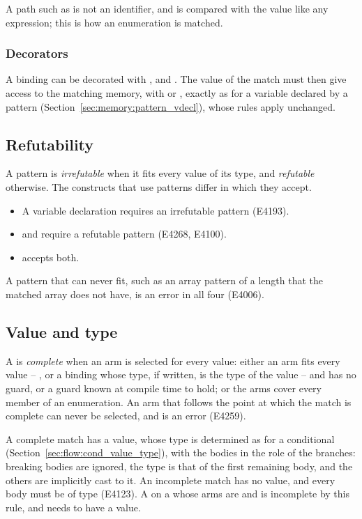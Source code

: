 A path such as  is not an identifier, and is compared with the
value like any expression; this is how an enumeration is matched.

\subsubsection{Decorators}

A binding can be decorated with ,  and . The
value of the match must then give access to the matching memory, with
 or , exactly as for a variable declared by a pattern
(Section~\ref{sec:memory:pattern_vdecl}), whose rules apply unchanged.

\subsection{Refutability}

A pattern is \textit{irrefutable} when it fits every value of its type, and
\textit{refutable} otherwise. The constructs that use patterns differ in which
they accept.

\begin{itemize}
\item A variable declaration requires an irrefutable pattern (E4193).
\item {} and  require a refutable pattern (E4268,
  E4100).
\item {} accepts both.
\end{itemize}

A pattern that can never fit, such as an array pattern of a length that the
matched array does not have, is an error in all four (E4006).

\subsection{Value and type}

A  is \textit{complete} when an arm is selected for every value:
either an arm fits every value -- \token{\_}, or a binding whose type, if
written, is the type of the value -- and has no guard, or a guard known at
compile time to hold; or the arms cover every member of an enumeration.
An arm that follows the point at which the match is complete can never be
selected, and is an error (E4259).

A complete match has a value, whose type is determined as for a conditional
(Section~\ref{sec:flow:cond_value_type}), with the bodies in the role of the
branches: breaking bodies are ignored, the type is that of the first remaining
body, and the others are implicitly cast to it. An incomplete match has no value,
and every body must be of type  (E4123). A  on a
 whose arms are  and  is incomplete by this
rule, and needs \token{\_} to have a value.

